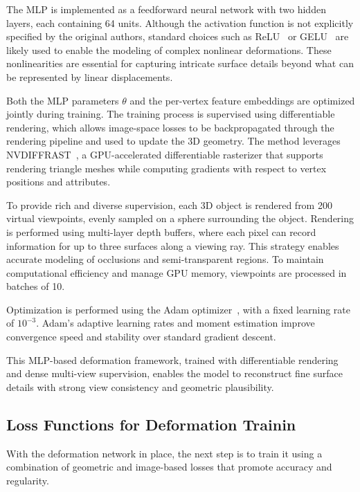 The MLP is implemented as a feedforward neural network with two hidden layers, each containing 64 units.  
Although the activation function is not explicitly specified by the original authors, standard choices such as ReLU~\cite{nair2010} or GELU~\cite{hendrycks2023} are likely used to enable the modeling of complex nonlinear deformations.  
These nonlinearities are essential for capturing intricate surface details beyond what can be represented by linear displacements.

Both the MLP parameters $\theta$ and the per-vertex feature embeddings are optimized jointly during training.  
The training process is supervised using differentiable rendering, which allows image-space losses to be backpropagated through the rendering pipeline and used to update the 3D geometry.  
The method leverages \textsc{NVDIFFRAST}~\cite{laine2020}, a GPU-accelerated differentiable rasterizer that supports rendering triangle meshes while computing gradients with respect to vertex positions and attributes.

To provide rich and diverse supervision, each 3D object is rendered from 200 virtual viewpoints, evenly sampled on a sphere surrounding the object.  
Rendering is performed using multi-layer depth buffers, where each pixel can record information for up to three surfaces along a viewing ray.  
This strategy enables accurate modeling of occlusions and semi-transparent regions.  
To maintain computational efficiency and manage GPU memory, viewpoints are processed in batches of 10.

Optimization is performed using the Adam optimizer~\cite{kingma2017}, with a fixed learning rate of $10^{-3}$.  
Adam's adaptive learning rates and moment estimation improve convergence speed and stability over standard gradient descent.

This MLP-based deformation framework, trained with differentiable rendering and dense multi-view supervision, enables the model to reconstruct fine surface details with strong view consistency and geometric plausibility.

\subsection{Loss Functions for Deformation Trainin}

With the deformation network in place, the next step is to train it using a combination of geometric and image-based losses that promote accuracy and regularity.

